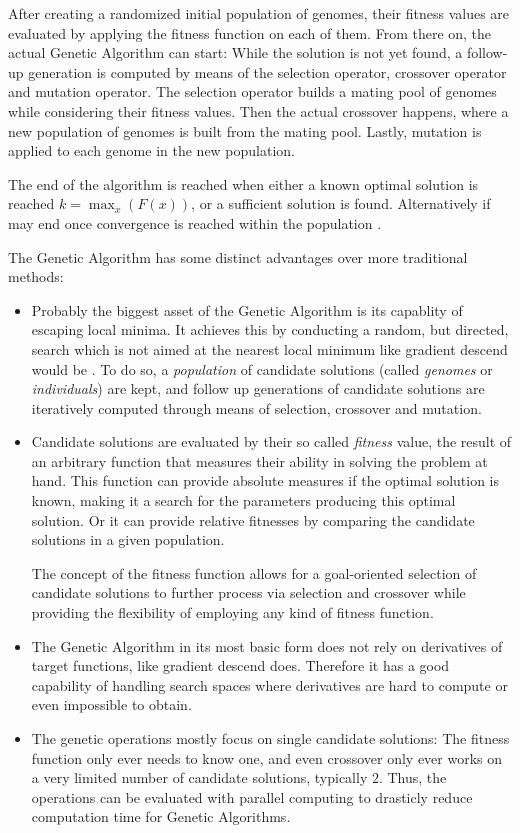 \documentclass[11pt,a4paper,twoside,openright]{scrbook}
\begin{document}
\bigskip
After creating a randomized initial population of genomes, their fitness values are evaluated by applying the fitness function on each of them. From there on, the actual Genetic Algorithm can start: While the solution is not yet found, a follow-up generation is computed by means of the selection operator, crossover operator and mutation operator. The selection operator builds a mating pool of genomes while considering their fitness values. Then the actual crossover happens, where a new population of genomes is built from the mating pool. Lastly, mutation is applied to each genome in the new population.

The end of the algorithm is reached when either a known optimal solution is reached \(k = \operatorname{max}_x(F(x))\), or a sufficient solution is found. Alternatively if may end once convergence is reached within the population \cite[p.\,28]{Haupt98}.

The Genetic Algorithm has some distinct advantages over more traditional methods:
\begin{itemize}
  \item Probably the biggest asset of the Genetic Algorithm is its capablity of escaping local minima. It achieves this by conducting a random, but directed, search which is not aimed at the nearest local minimum like gradient descend would be \cite{Srinivas94}. To do so, a \emph{population} of candidate solutions (called \emph{genomes} or \emph{individuals}) are kept, and follow up generations of candidate solutions are iteratively computed through means of selection, crossover and mutation.

  \item Candidate solutions are evaluated by their so called \emph{fitness} value, the result of an arbitrary function that measures their ability in solving the problem at hand. This function can provide absolute measures if the optimal solution is known, making it a search for the parameters producing this optimal solution. Or it can provide relative fitnesses by comparing the candidate solutions in a given population.

  The concept of the fitness function allows for a goal-oriented selection of candidate solutions to further process via selection and crossover while providing the flexibility of employing any kind of fitness function.

  \item The Genetic Algorithm in its most basic form does not rely on derivatives of target functions, like gradient descend does. Therefore it has a good capability of handling search spaces where derivatives are hard to compute or even impossible to obtain.

  \item The genetic operations mostly focus on single candidate solutions: The fitness function only ever needs to know one, and even crossover only ever works on a very limited number of candidate solutions, typically \(2\). Thus, the operations can be evaluated with parallel computing to drasticly reduce computation time for Genetic Algorithms.
\end{itemize}
\end{document}
